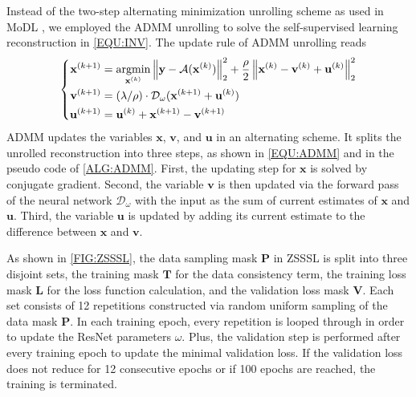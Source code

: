 \documentclass[journal,twoside,web]{ieeecolor}
\newcommand{\argmin}{\operatornamewithlimits{argmin}}
\newcommand{\norm}[1]{\left\lVert#1\right\rVert}
\begin{document}
	Instead of the two-step alternating minimization unrolling scheme as used in MoDL
	\cite{aggarwal_2018_modl},
	we employed the ADMM unrolling
	to solve the self-supervised learning reconstruction
	in \cref{EQU:INV}. The update rule of ADMM unrolling reads
	\begin{equation} \label{EQU:ADMM}
		\left\{\begin{aligned}
			\mathbf{x}^{(k+1)} &= \argmin_{\mathbf{x}^{(k)}} \norm{\mathbf{y} - \mathcal{A}(\mathbf{x}^{(k)})}_2^2 + \frac{\rho}{2} \norm{ \mathbf{x}^{(k)} - \mathbf{v}^{(k)} + \mathbf{u}^{(k)}}_2^2 \\
			\mathbf{v}^{(k+1)} &= (\lambda/\rho) \cdot \mathcal{D}_{\omega} (\mathbf{x}^{(k+1)} + \mathbf{u}^{(k)}) \\
			\mathbf{u}^{(k+1)} &= \mathbf{u}^{(k)} + \mathbf{x}^{(k+1)} - \mathbf{v}^{(k+1)}
		\end{aligned}\right.
	\end{equation}
	ADMM updates the variables $\mathbf{x}$, $\mathbf{v}$,
	and $\mathbf{u}$ in an alternating scheme.
	It splits the unrolled reconstruction into three steps,
	as shown in \cref{EQU:ADMM} and in the pseudo code of \cref{ALG:ADMM}.
	First, the updating step for $\mathbf{x}$ is solved by conjugate gradient.
	Second, the variable $\mathbf{v}$ is then updated
	via the forward pass of the neural network $\mathcal{D}_{\omega}$
	with the input as the sum of current estimates
	of $\mathbf{x}$ and $\mathbf{u}$.
	Third, the variable $\mathbf{u}$ is updated
	by adding its current estimate to the difference
	between $\mathbf{x}$ and $\mathbf{v}$.

	As shown in \cref{FIG:ZSSSL}, the data sampling mask $\mathbf{P}$
	in ZSSSL \cite{yaman_2022_zs} is split into
	three disjoint sets, the training mask $\mathbf{T}$ for the data consistency term,
	the training loss mask $\mathbf{L}$ for the loss function calculation,
	and the validation loss mask $\mathbf{V}$.
	Each set consists of 12 repetitions constructed via random uniform sampling
	of the data mask $\mathbf{P}$.
	In each training epoch, every repetition is looped through
	in order to update the ResNet parameters $\omega$.
	Plus, the validation step is performed after every training epoch
	to update the minimal validation loss.
	If the validation loss does not reduce for 12 consecutive epochs or
	if 100 epochs are reached, the training is terminated.
\end{document}
